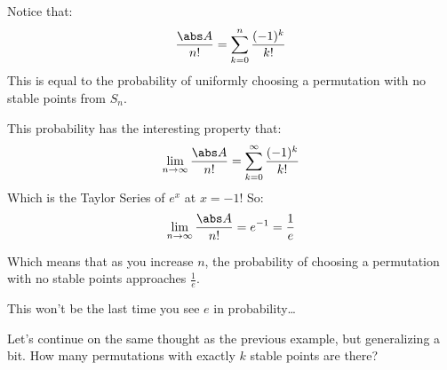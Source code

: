 \begin{note}

	Notice that:
	\[ \frac{\abs A}{n!} = \sum_{k=0}^n\frac{(-1)^k}{k!} \]
	This is equal to the probability of uniformly choosing a permutation with no stable points from $S_n$.

	This probability has the interesting property that:
	\[ \lim_{n\to\infty}\frac{\abs A}{n!} = \sum_{k=0}^\infty\frac{(-1)^k}{k!} \]
	Which is the Taylor Series of $e^x$ at $x=-1$!
	So:
	\[ \lim_{n\to\infty}\frac{\abs A}{n!} = e^{-1} = \frac1e \]

	Which means that as you increase $n$, the probability of choosing a permutation with no stable points approaches
	$\frac1e$.

	This won't be the last time you see $e$ in probability\dots

\end{note}

\begin{exam}

	Let's continue on the same thought as the previous example, but generalizing a bit.
	How many permutations with exactly $k$ stable points are there?

\end{exam}

